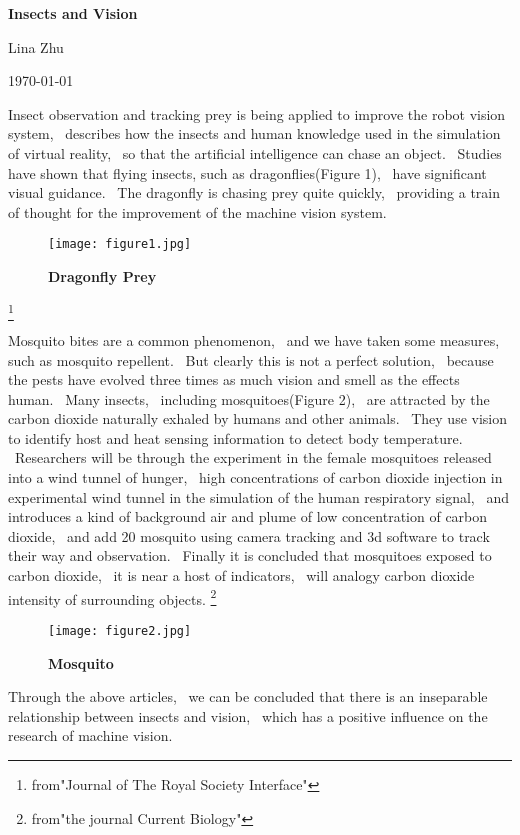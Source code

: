 \documentclass{article}
\begin{document}
	
	\begin{center}
		
		{\bfseries \LARGE Insects and Vision} 
		
	\end{center}
	\begin{center}
		Lina Zhu
	\end{center}
	\begin{center}
		\today
	\end{center}
	
	\par  Insect observation and tracking prey is being applied to improve the robot vision system,~ describes how the insects and human knowledge used in the simulation of virtual reality,~ so that the artificial intelligence can chase an object.~ Studies have shown that flying insects, such as dragonflies(Figure 1), ~have significant visual guidance.~ The dragonfly is chasing prey quite quickly,~ providing a train of thought for the improvement of the machine vision system.
\begin{figure}[htp]
	\centering
	\texttt{[image: figure1.jpg]}
	\caption{\bfseries{Dragonfly Prey}}\label{pic1}
		\end{figure}
\footnote{from"Journal of The Royal Society Interface"} 
\par  Mosquito bites are a common phenomenon,~ and we have taken some measures,~ such as mosquito repellent.~ But clearly this is not a perfect solution,~ because the pests have evolved three times as much vision and smell as the effects human.~ Many insects,~ including mosquitoes(Figure 2),~ are attracted by the carbon dioxide naturally exhaled by humans and other animals. ~They use vision to identify host and heat sensing information to detect body temperature. ~Researchers will be through the experiment in the female mosquitoes released into a wind tunnel of hunger,~ high concentrations of carbon dioxide injection in experimental wind tunnel in the simulation of the human respiratory signal,~ and introduces a kind of background air and plume of low concentration of carbon dioxide,~ and add 20 mosquito using camera tracking and 3d software to track their way and observation.~ Finally it is concluded that mosquitoes exposed to carbon dioxide,~ it is near a host of indicators,~ will analogy carbon dioxide intensity of surrounding objects.
	\footnote{from"the journal Current Biology"} 
	\begin{figure}[htp]
		\centering
		\texttt{[image: figure2.jpg]}
		\caption{\bfseries{Mosquito}}\label{pic2}

	\end{figure}
\par Through the above articles,~ we can be concluded that there is an inseparable relationship between insects and vision,~ which has a positive influence on the research of machine vision.
\end{document}
